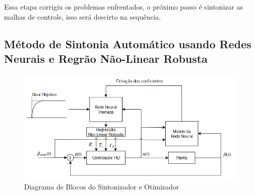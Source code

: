 Essa etapa corrigiu os problemas enfrentados, o próximo passo é sintonizar as malhas de controle, isso será descirto na sequência.


\subsection{Método de Sintonia Automático usando Redes Neurais e Regrão Não-Linear Robusta}

\begin{figure}[H]
  \caption{Diagrama de Blocos do Sintonizador e Otimizador}
  \begin{center}
      \includegraphics[scale=.65]{metodologia/img/neural_regression}
  \end{center}
  \label{fig:neural_regression}
\end{figure}